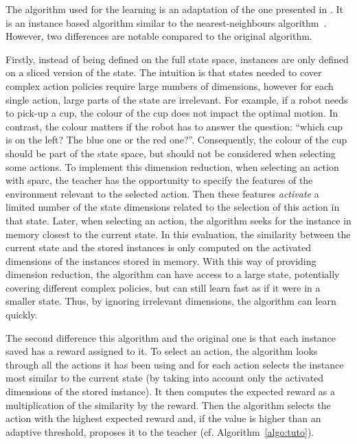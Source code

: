 The algorithm used for the learning is an adaptation of the one presented in \cite{senft2017toward}. It is an instance based algorithm similar to the nearest-neighbours algorithm~\citep{cover1967nearest}. However, two differences are notable compared to the original algorithm. %

Firstly, instead of being defined on the full state space, instances are only defined on a sliced version of the state. The intuition is that states needed to cover complex action policies require large numbers of dimensions, however for each single action, large parts of the state are irrelevant. For example, if a robot needs to pick-up a cup, the colour of the cup does not impact the optimal motion. In contrast, the colour matters if the robot has to answer the question: ``which cup is on the left? The blue one or the red one?''. Consequently, the colour of the cup should be part of the state space, but should not be considered when selecting some actions. To implement this dimension reduction, when selecting an action with \gls{sparc}, the teacher has the opportunity to specify the features of the environment relevant to the selected action. Then these features \textit{activate} a limited number of the state dimensions related to the selection of this action in that state. Later, when selecting an action, the algorithm seeks for the instance in memory closest to the current state. In this evaluation, the similarity between the current state and the stored instances is only computed on the activated dimensions of the instances stored in memory. With this way of providing dimension reduction, the algorithm can have access to a large state, potentially covering different complex policies, but can still learn fast as if it were in a smaller state. Thus, by ignoring irrelevant dimensions, the algorithm can learn quickly.

The second difference this algorithm and the original one is that each instance saved has a reward assigned to it. To select an action, the algorithm looks through all the actions it has been using and for each action selects the instance most similar to the current state (by taking into account only the activated dimensions of the stored instance). It then computes the expected reward as a multiplication of the similarity by the reward. Then the algorithm selects the action with the highest expected reward and, if the value is higher than an adaptive threshold, proposes it to the teacher (cf. Algorithm~\ref{algo:tuto}). 

